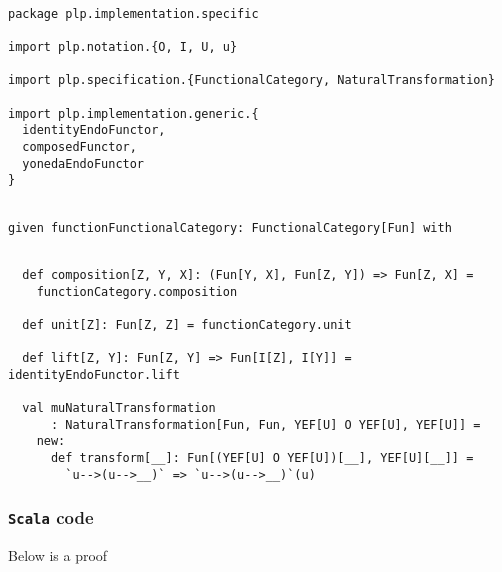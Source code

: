 \documentclass[11pt]{article}
\newcommand{\code}{\subsubsection{{\tt Scala} code}\begingroup\rm \vspace{12pt}}
\def\edefn{\endgroup\par\pagebreak[2]\addvspace{\medskipamount}}
\let\ecode=\edefn
\begin{document}
\vspace{6pt}
\begin{mdframed}[backgroundcolor=lightgray!20] 
\begin{lstlisting}

package plp.implementation.specific

import plp.notation.{O, I, U, u}

import plp.specification.{FunctionalCategory, NaturalTransformation}

import plp.implementation.generic.{
  identityEndoFunctor,
  composedFunctor,
  yonedaEndoFunctor
}
\end{lstlisting}
\end{mdframed}
\vspace{6pt}
\begin{mdframed}[backgroundcolor=lightgray!20] 
\begin{lstlisting}

given functionFunctionalCategory: FunctionalCategory[Fun] with  
\end{lstlisting}
\end{mdframed}
\vspace{6pt}
\begin{mdframed}[backgroundcolor=lightgray!20] 
\begin{lstlisting} 

  def composition[Z, Y, X]: (Fun[Y, X], Fun[Z, Y]) => Fun[Z, X] =
    functionCategory.composition

  def unit[Z]: Fun[Z, Z] = functionCategory.unit

  def lift[Z, Y]: Fun[Z, Y] => Fun[I[Z], I[Y]] = identityEndoFunctor.lift

  val muNaturalTransformation
      : NaturalTransformation[Fun, Fun, YEF[U] O YEF[U], YEF[U]] =
    new:
      def transform[__]: Fun[(YEF[U] O YEF[U])[__], YEF[U][__]] =
        `u-->(u-->__)` => `u-->(u-->__)`(u)
\end{lstlisting}
\end{mdframed}    
\ecode

\code
Below is a proof
\end{document}
